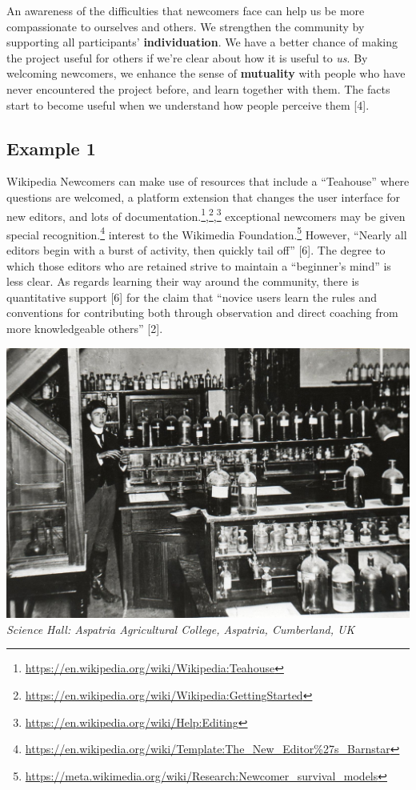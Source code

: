 An awareness of the difficulties that newcomers face can help us be more
compassionate to ourselves and others. We strengthen the community by
supporting all participants' \textbf{individuation}. We have a better
chance of making the project useful for others if we're clear about how
it is useful to \emph{us}. By welcoming newcomers, we enhance the sense
of \textbf{mutuality} with people who have never encountered the project
before, and learn together with them. The facts start to become useful
when we understand how people perceive them {{[}4{]}}.

\hypertarget{example-1}{%
\subsection{Example 1}\label{example-1}}

Wikipedia {{Newcomers}} can make use of resources that include a
``Teahouse'' where questions are welcomed, a platform extension that
changes the user interface for new editors, and lots of
documentation.\footnote{\url{https://en.wikipedia.org/wiki/Wikipedia:Teahouse}},\footnote{\url{https://en.wikipedia.org/wiki/Wikipedia:GettingStarted}},\footnote{\url{https://en.wikipedia.org/wiki/Help:Editing}}
exceptional newcomers may be given special recognition.\footnote{\url{https://en.wikipedia.org/wiki/Template:The_New_Editor\%27s_Barnstar}}
interest to the Wikimedia Foundation.\footnote{\url{https://meta.wikimedia.org/wiki/Research:Newcomer_survival_models}}
However, ``Nearly all editors begin with a burst of activity, then
quickly tail off'' {{[}6{]}}. The degree to which those editors who are
retained strive to maintain a ``beginner's mind'' is less clear. As
regards learning their way around the community, there is quantitative
support {{[}6{]}} for the claim that ``novice users learn the rules and
conventions for contributing both through observation and direct
coaching from more knowledgeable others'' {{[}2{]}}.

\includegraphics{images/The_Science_Laboratory.jpg}\\
\emph{Science Hall: Aspatria Agricultural College, Aspatria, Cumberland,
UK}

